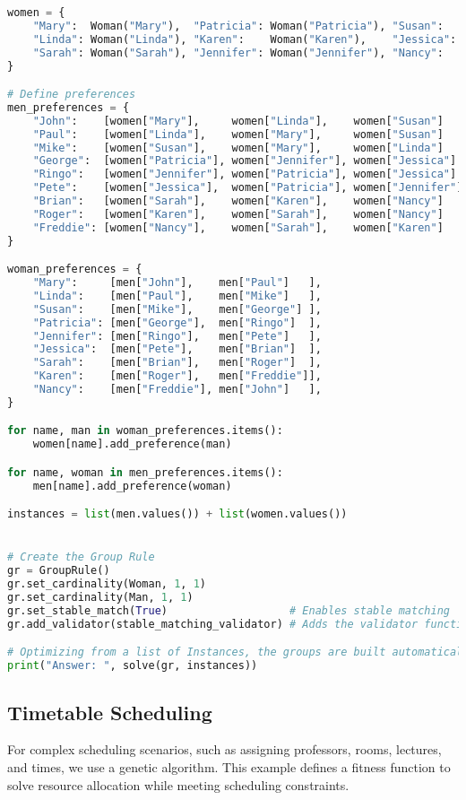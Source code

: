 \begin{lstlisting}[language=Python, caption={Creating and solving the Stable Marriage Problem using this framework.}, label={script:stable_marriage}]
women = {
    "Mary":  Woman("Mary"),  "Patricia": Woman("Patricia"), "Susan":   Woman("Susan"),
    "Linda": Woman("Linda"), "Karen":    Woman("Karen"),    "Jessica": Woman("Jessica"),
    "Sarah": Woman("Sarah"), "Jennifer": Woman("Jennifer"), "Nancy":   Woman("Nancy")
}

# Define preferences
men_preferences = {
    "John":    [women["Mary"],     women["Linda"],    women["Susan"]   ],
    "Paul":    [women["Linda"],    women["Mary"],     women["Susan"]   ],
    "Mike":    [women["Susan"],    women["Mary"],     women["Linda"]   ],
    "George":  [women["Patricia"], women["Jennifer"], women["Jessica"] ],
    "Ringo":   [women["Jennifer"], women["Patricia"], women["Jessica"] ],
    "Pete":    [women["Jessica"],  women["Patricia"], women["Jennifer"]],
    "Brian":   [women["Sarah"],    women["Karen"],    women["Nancy"]   ],
    "Roger":   [women["Karen"],    women["Sarah"],    women["Nancy"]   ],
    "Freddie": [women["Nancy"],    women["Sarah"],    women["Karen"]   ],
}

woman_preferences = {
    "Mary":     [men["John"],    men["Paul"]   ],
    "Linda":    [men["Paul"],    men["Mike"]   ],
    "Susan":    [men["Mike"],    men["George"] ],
    "Patricia": [men["George"],  men["Ringo"]  ],
    "Jennifer": [men["Ringo"],   men["Pete"]   ],
    "Jessica":  [men["Pete"],    men["Brian"]  ],
    "Sarah":    [men["Brian"],   men["Roger"]  ],
    "Karen":    [men["Roger"],   men["Freddie"]],
    "Nancy":    [men["Freddie"], men["John"]   ],
}

for name, man in woman_preferences.items():
    women[name].add_preference(man)

for name, woman in men_preferences.items():
    men[name].add_preference(woman)

instances = list(men.values()) + list(women.values())


# Create the Group Rule
gr = GroupRule()
gr.set_cardinality(Woman, 1, 1)
gr.set_cardinality(Man, 1, 1)
gr.set_stable_match(True)                   # Enables stable matching
gr.add_validator(stable_matching_validator) # Adds the validator function

# Optimizing from a list of Instances, the groups are built automatically.
print("Answer: ", solve(gr, instances))
\end{lstlisting}

\subsection{Timetable Scheduling}
For complex scheduling scenarios, such as assigning professors, rooms, lectures, and times, we use a genetic algorithm. This example defines a fitness function to solve resource allocation while meeting scheduling constraints. 

